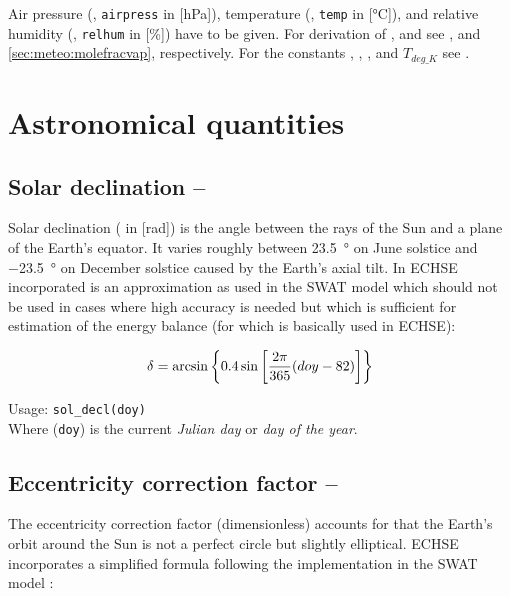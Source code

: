 Air pressure (\airPressure{}, \verb!airpress! in [\si{\hecto\pascal}]), temperature (\airtemp{}, \verb!temp! in [\si{\degreeCelsius}]), and relative humidity (\relHumidity{}, \verb!relhum! in [\si{\percent}]) have to be given. For derivation of \compressibilityFactor{}, and \moleFracWaterVap{} see , and \ref{sec:meteo:molefracvap}, respectively. For the constants \molMassDryAir{}, \molMassWater{}, \molGasConst{}, and $T_{deg\_K}$ see .


\section{Astronomical quantities}

\subsection{Solar declination -- \solDecl} \label{sec:meteo:soldecl}
Solar declination (\solDecl{} in [\si{\radian}]) is the angle between the rays of the Sun and a plane of the Earth's equator. It varies roughly between \SI{+23.5}{\degree} on June solstice and \SI{-23.5}{\degree} on December solstice caused by the Earth's axial tilt. In ECHSE incorporated is an approximation as used in the SWAT model \citep{Neitsch2011} which should not be used in cases where high accuracy is needed but which is sufficient for estimation of the energy balance (for which \solDecl{} is basically used in ECHSE):

\begin{equation}\label{eqn:meteo:soldecl}
\delta{} = \arcsin \left\{ 0.4 \sin \left[ \frac{2 \pi}{365} (doy{} - 82) \right] \right\}
\end{equation}

\noindent
Usage:
\verb!sol_decl(doy)!\\

Where \doy{} (\verb!doy!) is the current \emph{Julian day} or \emph{day of the year}.


\subsection{Eccentricity correction factor -- \eccCorr} \label{sec:meteo:eccorr}
The eccentricity correction factor \eccCorr{} (dimensionless) accounts for that the Earth's orbit around the Sun is not a perfect circle but slightly elliptical. ECHSE incorporates a simplified formula following the implementation in the SWAT model \citep{Neitsch2011}:

